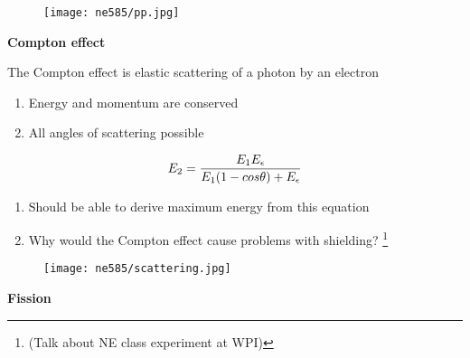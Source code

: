 \documentclass[aspectratio=1610,pdftex,dvipsnames,compress,xcolor={dvipsnames}]{beamer}
\begin{document}
\begin{frame}{}
    \begin{figure}
        \centering
        \texttt{[image: ne585/pp.jpg]}
    \end{figure}
\end{frame}


\begin{frame}[plain]{}
    \centering\LARGE\textbf{Compton effect}
\end{frame}


\addtocounter{framenumber}{-1} 
\begin{frame}{The Compton effect is elastic scattering of a photon by an electron}
    \begin{enumerate}[series=outerlist,topsep=0pt,itemsep=21pt,leftmargin=*,label=(\arabic*)]
        \item[]Energy and momentum are conserved
        \item[]All angles of scattering possible
    \end{enumerate}

    \begin{equation}
        \LARGE
        E_2 = \frac{E_1 E_{\epsilon}}{E_1 (1 - cos \theta) + E_{\epsilon}}
    \end{equation}

    \vspace*{\fill}

    \begin{enumerate}[series=outerlist,topsep=0pt,itemsep=21pt,leftmargin=*,label=(\arabic*)]
        \item[]Should be able to derive maximum energy from this equation
        \item[]Why would the Compton effect cause problems with shielding?
            \footnote[frame]{\tiny(Talk about NE class experiment at WPI)}
    \end{enumerate}
\end{frame}


\begin{frame}{}
    \begin{figure}
        \centering
        \texttt{[image: ne585/scattering.jpg]}
    \end{figure}
\end{frame}


\begin{frame}[plain]{}
    \centering\LARGE\textbf{Fission}
\end{frame}
\end{document}
